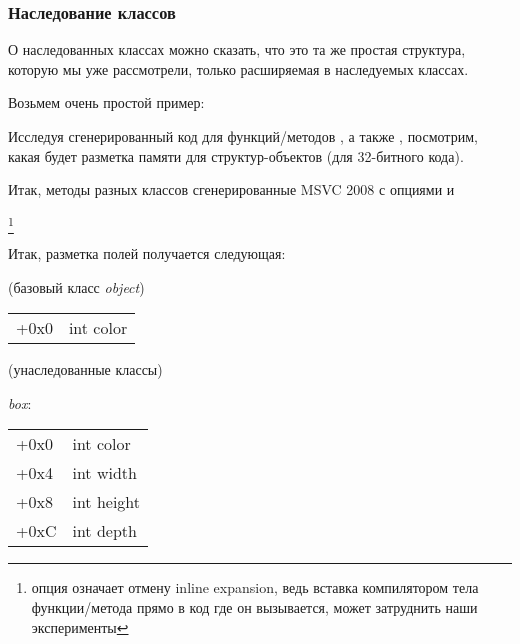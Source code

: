 \subsubsection{Наследование классов}
\label{cpp_inheritance}

О наследованных классах можно сказать, что это та же простая структура, которую мы уже рассмотрели, 
только расширяемая в наследуемых классах.


Возьмем очень простой пример:



Исследуя сгенерированный код для функций/методов , а также ,
посмотрим, какая будет разметка памяти для структур-объектов (для 32-битного кода).


Итак, методы  разных классов сгенерированные MSVC 2008 с опциями \Ox и \Obzero

\footnote{опция \Obzero означает отмену inline expansion, 
ведь вставка компилятором тела функции/метода прямо в код где он вызывается, 
может затруднить наши эксперименты
}







Итак, разметка полей получается следующая:

(базовый класс \emph{object})

\begin{center}
\begin{tabular}{ | l | l | }
\hline
  \tableheader{} \\
\hline
  +0x0 & int color \\
\hline
\end{tabular}
\end{center}

(унаследованные классы)

\emph{box}:

\begin{center}
\begin{tabular}{ | l | l | }
\hline
  \tableheader{} \\
\hline
  +0x0 & int color \\
\hline
  +0x4 & int width \\
\hline
  +0x8 & int height \\
\hline
  +0xC & int depth \\
\hline
\end{tabular}
\end{center}

